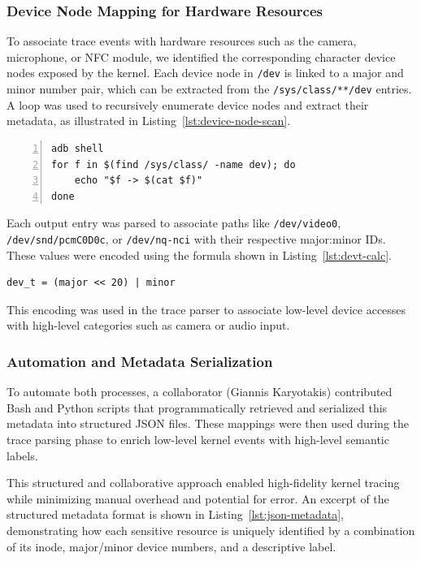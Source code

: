 \documentclass[a4paper,12pt]{report}
\begin{document}
\subsubsection{Device Node Mapping for Hardware Resources}

To associate trace events with hardware resources such as the camera, microphone, or NFC module, we identified the corresponding character device nodes exposed by the kernel. Each device node in \texttt{/dev} is linked to a major and minor number pair, which can be extracted from the \texttt{/sys/class/**/dev} entries. A loop was used to recursively enumerate device nodes and extract their metadata, as illustrated in Listing~\ref{lst:device-node-scan}.

\begin{lstlisting}[caption={Enumerating character and block devices with major:minor IDs},label={lst:device-node-scan},numbers=left]
adb shell
for f in $(find /sys/class/ -name dev); do
    echo "$f -> $(cat $f)"
done
\end{lstlisting}

Each output entry was parsed to associate paths like \texttt{/dev/video0}, \texttt{/dev/snd/pcmC0D0c}, or \texttt{/dev/nq-nci} with their respective major:minor IDs. These values were encoded using the formula shown in Listing~\ref{lst:devt-calc}.

\begin{lstlisting}[caption={Encoding device number using major and minor},label={lst:devt-calc},numbers=none]
dev_t = (major << 20) | minor
\end{lstlisting}

This encoding was used in the trace parser to associate low-level device accesses with high-level categories such as camera or audio input.

\subsubsection{Automation and Metadata Serialization}

To automate both processes, a collaborator (Giannis Karyotakis) contributed Bash and Python scripts that programmatically retrieved and serialized this metadata into structured JSON files. These mappings were then used during the trace parsing phase to enrich low-level kernel events with high-level semantic labels.

This structured and collaborative approach enabled high-fidelity kernel tracing while minimizing manual overhead and potential for error.
An excerpt of the structured metadata format is shown in Listing~\ref{lst:json-metadata}, demonstrating how each sensitive resource is uniquely identified by a combination of its inode, major/minor device numbers, and a descriptive label.
\end{document}

